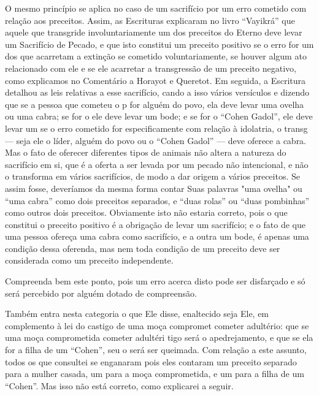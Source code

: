 O mesmo princípio se aplica no caso de um sacrifício por um erro
cometido com relação aos preceitos. Assim, as Escrituras explicaram no
livro ``Vayikrá'' que aquele que transgride involuntariamente um dos
preceitos do Eterno deve levar um Sacrifício de Pecado, e que isto
constitui um preceito positivo se o erro for um dos que acarretam a
extinção se cometido voluntaria­mente, se houver algum ato relacionado
com ele e se ele acarretar a transgres­são de um preceito negativo, como
explicamos no Comentário a Horayot e Que­retot. Em seguida, a Escritura
detalhou as leis relativas a esse sacrifício, cando a isso vários
versículos e dizendo que se a pessoa que cometeu o p for alguém do povo,
ela deve levar uma ovelha ou uma cabra; se for o ele deve levar um bode;
e se for o ``Cohen Gadol'', ele deve levar um se o erro cometido for
especificamente com relação à idolatria, o transg --- seja ele o líder,
alguém do povo ou o ``Cohen Gadol'' --- deve oferece a cabra. Mas o fato
de oferecer diferentes tipos de animais não altera a natureza do
sacrifício em si, que é a oferta a ser levada por um pecado não
intencional, e não o transforma em vários sacrifícios, de modo a dar
origem a vários precei­tos. Se assim fosse, deveríamos da mesma forma
contar Suas palavras "uma ove­lha" ou ``uma cabra'' como dois preceitos
separados, e ``duas rolas'' ou ``duas pombinhas'' como outros dois
preceitos. Obviamente isto não estaria correto, pois o que constitui o
preceito positivo é a obrigação de levar um sacrifício; e o fato de que
uma pessoa ofereça uma cabra como sacrifício, e a outra um bode, é
apenas uma condição dessa oferenda, mas nem toda condição de um preceito
deve ser considerada como um preceito independente.

Compreenda bem este ponto, pois um erro acerca disto pode ser disfarçado
e só será percebido por alguém dotado de compreensão.

Também entra nesta categoria o que Ele disse, enaltecido seja Ele,
em complemento à lei do castigo de uma moça compromet cometer
adultério: que se uma moça comprometida cometer adultéri tigo será
o apedrejamento, e que se ela for a filha de um ``Cohen'', seu o será ser
queimada. Com relação a este assunto,
todos os que consultei se enganaram pois eles contaram um preceito
separado para a mulher casada, um para a moça comprometida, e um para a
filha de um ``Cohen''. Mas isso não está correto, como explicarei a
seguir.

